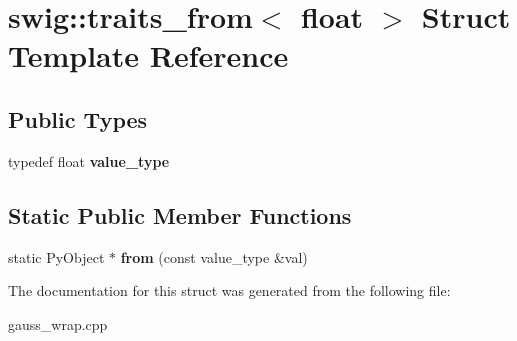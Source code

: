 \hypertarget{structswig_1_1traits__from_3_01float_01_4}{\section{swig\-:\-:traits\-\_\-from$<$ float $>$ Struct Template Reference}
\label{structswig_1_1traits__from_3_01float_01_4}
}
\subsection*{Public Types}
\begin{DoxyCompactItemize}
\item 
\hypertarget{structswig_1_1traits__from_3_01float_01_4_a2a9dc8bc23debb38726ec089d63e973a}{typedef float {\bfseries value\-\_\-type}}\label{structswig_1_1traits__from_3_01float_01_4_a2a9dc8bc23debb38726ec089d63e973a}

\end{DoxyCompactItemize}
\subsection*{Static Public Member Functions}
\begin{DoxyCompactItemize}
\item 
\hypertarget{structswig_1_1traits__from_3_01float_01_4_aa2ddc004c2b5fa9dbc19da5ddf6999bc}{static Py\-Object $\ast$ {\bfseries from} (const value\-\_\-type \&val)}\label{structswig_1_1traits__from_3_01float_01_4_aa2ddc004c2b5fa9dbc19da5ddf6999bc}

\end{DoxyCompactItemize}


The documentation for this struct was generated from the following file\-:\begin{DoxyCompactItemize}
\item 
gauss\-\_\-wrap.\-cpp\end{DoxyCompactItemize}

